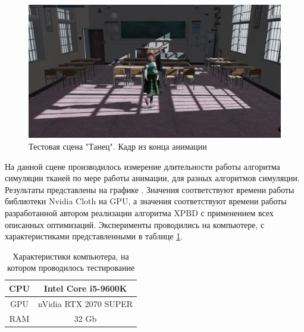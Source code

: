 	\begin{figure}[ht!] 
		\center
		\includegraphics [scale=0.35] {my_folder/images//dance3}	
		\caption{Тестовая сцена "Танец". Кадр из конца анимации} 
		\label{fig:dance3}
	\end{figure}
	
	\FloatBarrier
	
	На данной сцене производилось измерение длительности работы алгоритма симуляции тканей по мере работы анимации, для разных алгоритмов симуляции. Результаты представлены на графике . Значения  соответствуют времени работы библиотеки Nvidia Cloth на GPU, а значения  соответствуют времени работы разработанной автором реализации алгоритма XPBD с применением всех описанных оптимизаций. Эксперименты проводились на компьютере, с характеристиками представленными в таблице \ref{tab:spec}.
	
	\begin{table}[ht]
		\caption{Характеристики компьютера, на котором проводилось тестирование}
		\label{tab:spec}
		\centering
		\begin{SingleSpace}
			\begin{tabular}{|c|c|}
				\hline
				CPU & Intel Core 
				i5-9600K
				\\
				\hline
				GPU & nVidia RTX 2070 SUPER \\
				\hline
				RAM & 32 Gb \\
				\hline
		\end{tabular}
		\end{SingleSpace}
	\end{table}
	
